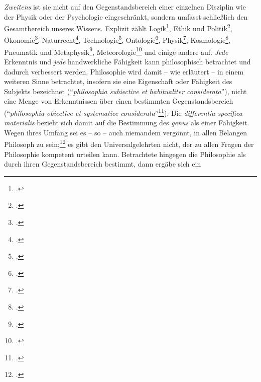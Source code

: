 \begin{nummerierung}
\emph{Zweitens} ist sie nicht auf den Gegenstandsbereich einer einzelnen
Disziplin wie der Physik oder der Psychologie eingeschränkt, sondern umfasst
schließlich den Gesamtbereich unseres Wissens. Explizit zählt
Logik\footcite[Vgl.][\S~61]{Wolff:Discursuspraeliminarisdephilosophiaingenere1996},
Ethik und
Politik\footcite[Vgl.][\S\S~63--65]{Wolff:Discursuspraeliminarisdephilosophiaingenere1996},
Ökonomie\footcite[Vgl.][\S~66\,f.]{Wolff:Discursuspraeliminarisdephilosophiaingenere1996},
Naturrecht\footcite[Vgl.][\S~68]{Wolff:Discursuspraeliminarisdephilosophiaingenere1996},
Technologie\footcite[Vgl.][\S~71]{Wolff:Discursuspraeliminarisdephilosophiaingenere1996},
Ontologie\footcite[Vgl.][\S~73]{Wolff:Discursuspraeliminarisdephilosophiaingenere1996},
Physik\footcite[Vgl.][\S
76]{Wolff:Discursuspraeliminarisdephilosophiaingenere1996},
Kosmologie\footcite[Vgl.][\S
77]{Wolff:Discursuspraeliminarisdephilosophiaingenere1996}, Pneumatik und
Metaphysik\footcite[Vgl.][\S~79]{Wolff:Discursuspraeliminarisdephilosophiaingenere1996},
Meteorologie\footcite[Vgl.][\S~80]{Wolff:Discursuspraeliminarisdephilosophiaingenere1996}
und einige andere auf. \emph{Jede} Erkenntnis und
\emph{jede} handwerkliche Fähigkeit kann philosophisch betrachtet und dadurch
verbessert werden. Philosophie wird damit -- wie
erläutert -- in einem weiteren Sinne betrachtet, insofern sie eine Eigenschaft
oder Fähigkeit des Subjekts bezeichnet (\enquote{\emph{philosophia subiective et
habitualiter considerata}}), nicht eine Menge von Erkenntnissen über einen
bestimmten Gegenstandsbereich (\enquote{\emph{philosophia obiective et
systematice
considerata}}\footnote{\label{Anmerkung:StiebritzZuSubiectiveundObiective}\cite[][\S~44]{Stiebritz:ErlaeuterungenderVernuenftigenGedanckenvondenKraefftendesmenschlichenVerstandesWolffs1977}.}).
Die \emph{differentia specifica materialis} bezieht sich damit auf die
Bestimmung des \emph{genus} als einer Fähigkeit. Wegen ihres Umfang sei es -- so
 -- auch
niemandem vergönnt, in allen Belangen Philosoph zu
sein;\footcite[Vgl.][\S~48]{Wolff:Discursuspraeliminarisdephilosophiaingenere1996}
es gibt den Universalgelehrten nicht, der zu allen Fragen der Philosophie
kompetent urteilen kann. Betrachtete
 hingegen die
Philosophie als durch ihren Gegenstandsbereich bestimmt, dann ergäbe sich ein

\end{nummerierung}
